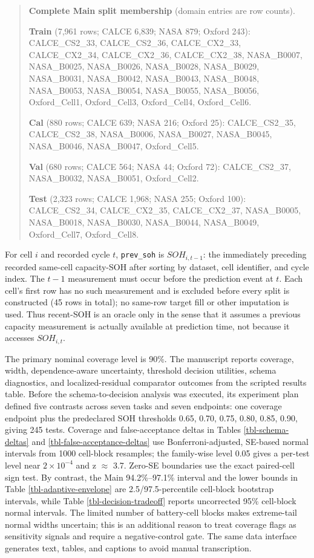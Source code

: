 \documentclass[
  number,
  preprint]{elsarticle}
\begin{document}
\begin{quote}
\scriptsize
\textbf{Complete Main split membership} (domain entries are row counts).\par
\textbf{Train} (7,961 rows; CALCE 6,839; NASA 879; Oxford 243): CALCE\_CS2\_33, CALCE\_CS2\_36, CALCE\_CX2\_33, CALCE\_CX2\_34, CALCE\_CX2\_36, CALCE\_CX2\_38, NASA\_B0007, NASA\_B0025, NASA\_B0026, NASA\_B0028, NASA\_B0029, NASA\_B0031, NASA\_B0042, NASA\_B0043, NASA\_B0048, NASA\_B0053, NASA\_B0054, NASA\_B0055, NASA\_B0056, Oxford\_Cell1, Oxford\_Cell3, Oxford\_Cell4, Oxford\_Cell6.

\textbf{Cal} (880 rows; CALCE 639; NASA 216; Oxford 25): CALCE\_CS2\_35, CALCE\_CS2\_38, NASA\_B0006, NASA\_B0027, NASA\_B0045, NASA\_B0046, NASA\_B0047, Oxford\_Cell5.

\textbf{Val} (680 rows; CALCE 564; NASA 44; Oxford 72): CALCE\_CS2\_37, NASA\_B0032, NASA\_B0051, Oxford\_Cell2.

\textbf{Test} (2,323 rows; CALCE 1,968; NASA 255; Oxford 100): CALCE\_CS2\_34, CALCE\_CX2\_35, CALCE\_CX2\_37, NASA\_B0005, NASA\_B0018, NASA\_B0030, NASA\_B0044, NASA\_B0049, Oxford\_Cell7, Oxford\_Cell8.
\end{quote}

For cell \(i\) and recorded cycle \(t\), \texttt{prev\_soh} is
\(SOH_{i,t-1}\): the immediately preceding recorded same-cell
capacity-SOH after sorting by dataset, cell identifier, and cycle index.
The \(t-1\) measurement must occur before the prediction event at \(t\).
Each cell's first row has no such measurement and is excluded before
every split is constructed (45 rows in total); no same-row target fill
or other imputation is used. Thus recent-SOH is an oracle only in the
sense that it assumes a previous capacity measurement is actually
available at prediction time, not because it accesses \(SOH_{i,t}\).

The primary nominal coverage level is 90\%. The manuscript reports
coverage, width, dependence-aware uncertainty, threshold decision
utilities, schema diagnostics, and localized-residual comparator
outcomes from the scripted results table. Before the schema-to-decision
analysis was executed, its experiment plan defined five contrasts across
seven tasks and seven endpoints: one coverage endpoint plus the
predeclared SOH thresholds 0.65, 0.70, 0.75, 0.80, 0.85, 0.90, giving
245 tests. Coverage and false-acceptance deltas in Tables
\ref{tbl-schema-deltas} and \ref{tbl-false-acceptance-deltas} use
Bonferroni-adjusted, SE-based normal intervals from 1000 cell-block
resamples; the family-wise level 0.05 gives a per-test level near
\(2\times10^{-4}\) and z \(\approx\) 3.7. Zero-SE boundaries use the
exact paired-cell sign test. By contrast, the Main 94.2\%--97.1\%
interval and the lower bounds in Table \ref{tbl-adaptive-envelope} are
2.5/97.5-percentile cell-block bootstrap intervals, while Table
\ref{tbl-decision-tradeoff} reports uncorrected 95\% cell-block normal
intervals. The limited number of battery-cell blocks makes extreme-tail
normal widths uncertain; this is an additional reason to treat coverage
flags as sensitivity signals and require a negative-control gate. The
same data interface generates text, tables, and captions to avoid manual
transcription.
\end{document}
